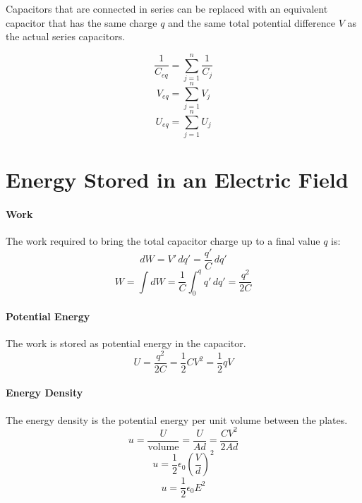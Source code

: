 \documentclass{article}
\begin{document}
        Capacitors that are connected in series can be replaced with an equivalent capacitor that has the same charge $q$ and the same total potential difference $V$ as the actual series capacitors.

        \begin{equation} \label{eq:series}
            \frac{1}{C_{eq}} = \sum_{j=1}^n \frac{1}{C_j}
        \end{equation}
        \begin{equation}
            V_{eq} = \sum_{j=1}^n V_j
        \end{equation}
        \begin{equation}
            U_{eq} = \sum_{j=1}^n U_j
        \end{equation}

    \section{Energy Stored in an Electric Field}

        \paragraph{Work}
        The work required to bring the total capacitor charge up to a final value $q$ is:
        \begin{equation}
            dW = V' \, dq' = \frac{q'}{C} \, dq' \nonumber
        \end{equation}
        \begin{equation}
            W = \int dW = \frac{1}{C} \int_0^q q' \, dq' = \frac{q^2}{2C} \nonumber
        \end{equation}

        \paragraph{Potential Energy}
        The work is stored as potential energy in the capacitor.
        \begin{equation}
            U = \frac{q^2}{2C} = \frac{1}{2}CV^2 = \frac{1}{2}qV
        \end{equation}

        \paragraph{Energy Density}
        The energy density is the potential energy per unit volume between the plates.
        \begin{equation}
            u = \frac{U}{\text{volume}} = \frac{U}{Ad} = \frac{CV^2}{2Ad} \nonumber
        \end{equation}
        \begin{equation}
            u = \frac{1}{2} \epsilon_0 \left(\frac{V}{d}\right)^2 \nonumber
        \end{equation}
        \begin{equation}
            u = \frac{1}{2} \epsilon_0 E^2
        \end{equation}
\end{document}

